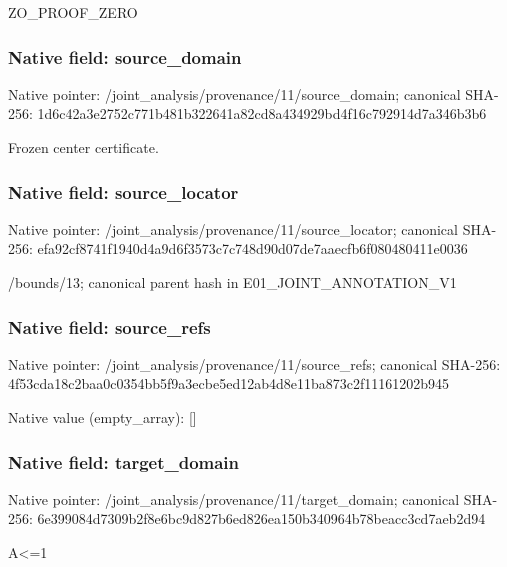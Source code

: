 \documentclass[10pt,a4paper]{article}
\begin{document}
\begingroup\raggedright\sloppy ZO\_\allowbreak{}PROOF\_\allowbreak{}ZERO\par\endgroup

\subsubsection{Native field: source\_\allowbreak{}domain}
Native pointer: /joint\_\allowbreak{}analysis/provenance/11/source\_\allowbreak{}domain; canonical SHA-256: 1d6c42a3e2752c771b481b322641a82cd8a434929bd4f16c792914d7a346b3b6

\begingroup\raggedright\sloppy Frozen center certificate.\par\endgroup

\subsubsection{Native field: source\_\allowbreak{}locator}
Native pointer: /joint\_\allowbreak{}analysis/provenance/11/source\_\allowbreak{}locator; canonical SHA-256: efa92cf8741f1940d4a9d6f3573c7c748d90d07de7aaecfb6f080480411e0036

\begingroup\raggedright\sloppy /\allowbreak{}bounds/\allowbreak{}13;\allowbreak{} canonical parent hash in E01\_\allowbreak{}JOINT\_\allowbreak{}ANNOTATION\_\allowbreak{}V1\par\endgroup

\subsubsection{Native field: source\_\allowbreak{}refs}
Native pointer: /joint\_\allowbreak{}analysis/provenance/11/source\_\allowbreak{}refs; canonical SHA-256: 4f53cda18c2baa0c0354bb5f9a3ecbe5ed12ab4d8e11ba873c2f11161202b945

Native value (empty\_\allowbreak{}array): []

\subsubsection{Native field: target\_\allowbreak{}domain}
Native pointer: /joint\_\allowbreak{}analysis/provenance/11/target\_\allowbreak{}domain; canonical SHA-256: 6e399084d7309b2f8e6bc9d827b6ed826ea150b340964b78beacc3cd7aeb2d94

\begingroup\raggedright\sloppy A<=\allowbreak{}1\par\endgroup
\end{document}
